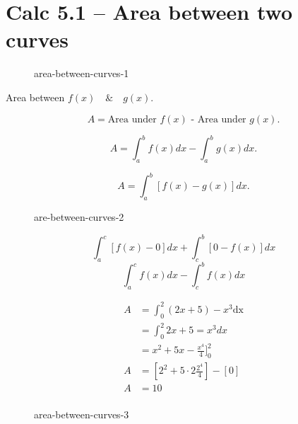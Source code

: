 \documentclass{book}
\begin{document}
\tableofcontents
\clearpage


\chapter{Calc 5.1 -- Area between two curves}


\begin{figure}[ht]
    \centering
    \caption{area-between-curves-1}
    \label{fig:area-between-curves-1}
\end{figure}

Area between $f(x)\quad \& \quad g(x)$.

\[ A= \text{Area under $f(x)$ - Area under $g(x)$} .\] 

\[ A= \int^b_a f(x) dx - \int^b_a g(x) dx .\] 

\[
    A=\int^b_a \left[f(x)-g(x)\right] dx
.\] 


\clearpage

\begin{figure}[htbp]
    \centering
    \caption{are-between-curves-2}
    \label{fig:are-between-curves-2}
\end{figure}

\[ \int_{a}^{c} \left[ f(x)-0 \right] dx + \int_{c}^{b}  \left[ 0-f(x) \right] dx \] 
\[ \int_{a}^{c}  f(x) dx - \int_{c}^{b} f(x) dx \] 





\begin{align*}
A &=\int_{0}^{2}  (2x+5) - x^3 \text{dx}\\
&= \int_{0}^{2}2x+5=x^3 dx   \\
&= x^2+5x - \frac{x^4}{4}]^2_0  \\
A &= \left[ 2^2+5\cdot 2 \frac{2^4}{4} \right] - \left[ 0 \right]   \\
A&= 10 \\
\end{align*}


\begin{figure}[htbp]
    \centering
    \caption{area-between-curves-3}
    \label{fig:area-between-curves-3}
\end{figure}    
\end{document}
